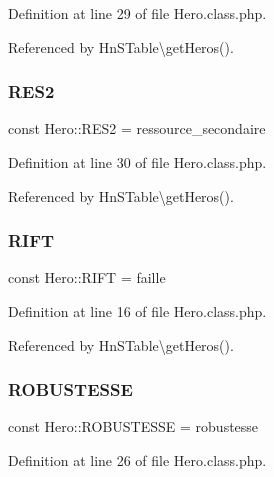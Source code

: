 Definition at line 29 of file Hero.\+class.\+php.



Referenced by Hn\+S\+Table\textbackslash{}get\+Heros().

\mbox{\label{class_hero_ac43bd6ccbfcd51139f3782a030dd4a2a}} 
\subsubsection{\texorpdfstring{R\+E\+S2}{RES2}}
{\footnotesize\ttfamily const Hero\+::\+R\+E\+S2 = \textquotesingle{}ressource\+\_\+secondaire\textquotesingle{}}



Definition at line 30 of file Hero.\+class.\+php.



Referenced by Hn\+S\+Table\textbackslash{}get\+Heros().

\mbox{\label{class_hero_a36e3c3c61f8c94e7120bd3067bf4559f}} 
\subsubsection{\texorpdfstring{R\+I\+FT}{RIFT}}
{\footnotesize\ttfamily const Hero\+::\+R\+I\+FT = \textquotesingle{}faille\textquotesingle{}}



Definition at line 16 of file Hero.\+class.\+php.



Referenced by Hn\+S\+Table\textbackslash{}get\+Heros().

\mbox{\label{class_hero_acde52ad608e3b20bdf32055320e45854}} 
\subsubsection{\texorpdfstring{R\+O\+B\+U\+S\+T\+E\+S\+SE}{ROBUSTESSE}}
{\footnotesize\ttfamily const Hero\+::\+R\+O\+B\+U\+S\+T\+E\+S\+SE = \textquotesingle{}robustesse\textquotesingle{}}



Definition at line 26 of file Hero.\+class.\+php.



